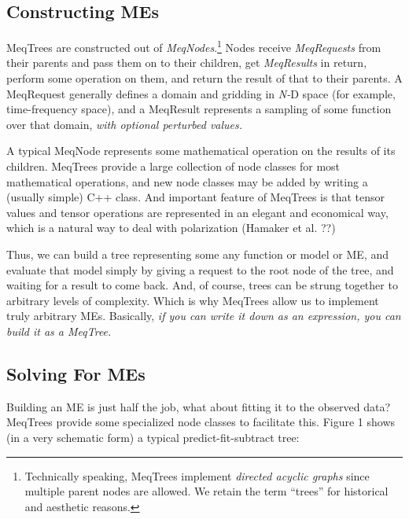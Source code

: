 \documentclass[11pt,twoside]{article}  %
\begin{document}
\subsection{Constructing MEs}

MeqTrees are constructed out of {\em MeqNodes}.\footnote{Technically speaking,
MeqTrees implement {\em directed acyclic graphs} since multiple parent nodes are
allowed. We retain the term ``trees'' for historical and aesthetic reasons.}
Nodes receive {\em MeqRequests} from their parents and pass them on to their
children, get {\em MeqResults} in return, perform some operation on them, and
return the result of that to their parents. A MeqRequest generally defines a
domain and gridding in {\em N-}D space (for example, time-frequency space), and
a MeqResult represents a sampling of some function over that domain, {\em with
optional perturbed values.}

A typical MeqNode represents some mathematical operation on the results of its
children. MeqTrees provide a large collection of node classes for most
mathematical operations, and new node classes may be added by writing a (usually
simple) C++ class. And important feature of MeqTrees is that tensor values and
tensor operations are represented in an elegant and economical way, which is a
natural way to deal with polarization (Hamaker et al. ??)

Thus, we can build a tree representing some any function or model or ME, and
evaluate that model simply by giving a request to the root node of the tree, and
waiting for a result to come back. And, of course, trees can be strung together
to arbitrary levels of complexity. Which is why MeqTrees allow us to implement
truly arbitrary MEs. Basically, {\em if you can write it down as an expression,
you can build it as a MeqTree.}

\subsection{Solving For MEs}

Building an ME is just half the job, what about fitting it to the observed data?
MeqTrees provide some specialized node classes to facilitate this. Figure 1
shows (in a very schematic form) a typical predict-fit-subtract tree:
\end{document}
